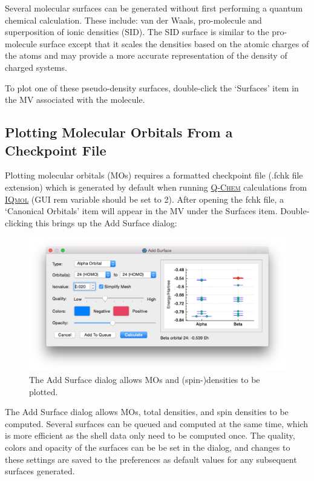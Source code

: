 \documentclass[a4paper,12pt]{article}
\newcommand{\qchem}{\href{https://q-chem.com}{{\scshape Q-Chem}}}
\newcommand{\iqmol}{\href{https://www.iqmol.org}{{\scshape IQmol}}}
\begin{document}
Several molecular surfaces can be generated without first performing a quantum
chemical calculation. These include: van der Waals, pro-molecule and
superposition of ionic densities (SID).  The SID surface is similar to the
pro-molecule surface except that it scales the densities based on the atomic
charges of the atoms and may provide a more accurate representation of the
density of charged systems.

To plot one of these pseudo-density surfaces, double-click the `Surfaces'
item in the MV associated with the molecule.




\subsection{Plotting Molecular Orbitals From a Checkpoint File}

\label{sec:mos}
Plotting molecular orbitals (MOs) requires a formatted checkpoint file (.fchk
file extension) which is generated by default when running \qchem{}
calculations from \iqmol{} (GUI rem variable should be set to 2).  After
opening the fchk file, a `Canonical Orbitals' item will appear in the MV under
the Surfaces item.
Double-clicking this brings up the Add Surface dialog:
\begin{figure}[h]
\begin{center}
\includegraphics[scale=0.25]{figures/MolecularOrbitalsConfigurator.png}
\caption{The Add Surface dialog allows MOs and (spin-)densities to be plotted.
} 
\label{fig:addsurface}
\end{center}
\end{figure}

The Add Surface dialog allows MOs, total densities, and spin densities  to be
computed.  Several surfaces can be queued and computed at the same time, which
is more efficient as the shell data only need to be computed once.  The
quality, colors and opacity of the surfaces can be be set in the dialog, and
changes to these settings are saved to the preferences as default values for
any subsequent surfaces generated.
\end{document}

